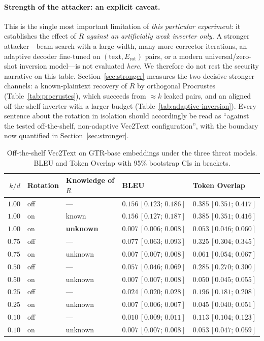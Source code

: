 \documentclass[11pt,a4paper]{article}
\begin{document}
\paragraph{Strength of the attacker: an explicit caveat.} This is the
single most important limitation of \emph{this particular experiment}: it
establishes the effect of $R$ \emph{against an artificially weak inverter
only}. A stronger attacker---beam search with a large width, many more
corrector iterations, an adaptive decoder fine-tuned on
$(\text{text}, E_{\mathrm{rot}})$ pairs, or a modern universal/zero-shot
inversion model---is not evaluated \emph{here}. We therefore do not rest
the security narrative on this table. Section~\ref{sec:stronger} measures
the two decisive stronger channels: a known-plaintext recovery of $R$ by
orthogonal Procrustes~\cite{ref_schonemann} (Table~\ref{tab:procrustes}),
which succeeds from $\approx k$ leaked pairs, and an aligned off-the-shelf
inverter with a larger budget (Table~\ref{tab:adaptive-inversion}). Every
sentence about the rotation in isolation should accordingly be read as
``against the tested off-the-shelf, non-adaptive Vec2Text configuration'',
with the boundary now quantified in Section~\ref{sec:stronger}.

\begin{table}[tb]
\centering
\caption{Off-the-shelf Vec2Text on GTR-base embeddings under the three
threat models. BLEU and Token Overlap with 95\% bootstrap CIs in
brackets.}
\label{tab:vec2text}
\small
\begin{tabular}{@{}rllll@{}}
\toprule
$k/d$ & Rotation & Knowledge of $R$ & BLEU & Token Overlap \\ \midrule
$1.00$ & off & --- & $0.156\,[0.123;\,0.186]$ & $0.385\,[0.351;\,0.417]$ \\
$1.00$ & on  & known & $0.156\,[0.127;\,0.187]$ & $0.385\,[0.351;\,0.416]$ \\
$1.00$ & on  & \textbf{unknown} & $\mathbf{0.007\,[0.006;\,0.008]}$ & $\mathbf{0.053\,[0.046;\,0.060]}$ \\
$0.75$ & off & --- & $0.077\,[0.063;\,0.093]$ & $0.325\,[0.304;\,0.345]$ \\
$0.75$ & on  & unknown & $0.007\,[0.007;\,0.008]$ & $0.061\,[0.054;\,0.067]$ \\
$0.50$ & off & --- & $0.057\,[0.046;\,0.069]$ & $0.285\,[0.270;\,0.300]$ \\
$0.50$ & on  & unknown & $0.007\,[0.007;\,0.008]$ & $0.050\,[0.045;\,0.055]$ \\
$0.25$ & off & --- & $0.024\,[0.020;\,0.028]$ & $0.196\,[0.181;\,0.208]$ \\
$0.25$ & on  & unknown & $0.007\,[0.006;\,0.007]$ & $0.045\,[0.040;\,0.051]$ \\
$0.10$ & off & --- & $0.010\,[0.009;\,0.011]$ & $0.113\,[0.104;\,0.123]$ \\
$0.10$ & on  & unknown & $0.007\,[0.007;\,0.008]$ & $0.053\,[0.047;\,0.059]$ \\
\bottomrule
\end{tabular}
\end{table}
\end{document}

